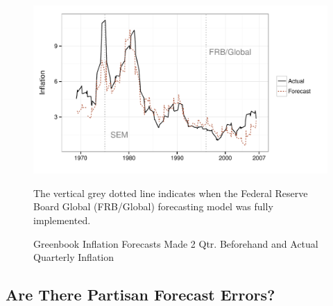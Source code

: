 \documentclass[a4paper]{article}\usepackage[]{graphicx}\usepackage[]{color}
\newenvironment{knitrout}{}{} %
\begin{document}
\begin{figure}[t]
    \caption{Greenbook Inflation Forecasts Made 2 Qtr. Beforehand and Actual Quarterly Inflation}
    \label{absolute}
    \begin{center}
    
\begin{knitrout}
\color{fgcolor}

{\centering \includegraphics[width=0.8\linewidth]{figure/BaseInflation} 

}



\end{knitrout}

    
    \end{center}
    \begin{singlespace}
        {\scriptsize{The vertical grey dotted line indicates when the Federal Reserve Board Global (FRB/Global) forecasting model was fully implemented.  
                      }}
    \end{singlespace}
\end{figure}


\subsection{Are There Partisan Forecast Errors?}
\end{document}

